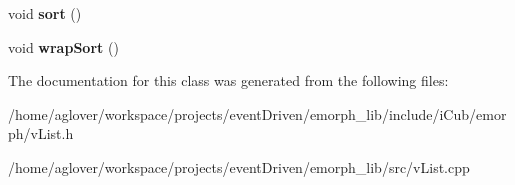 \begin{DoxyCompactItemize}
\item 
\hypertarget{classemorph_1_1vList_a82bd4f316654a59bebd0b48c43027d70}{void {\bfseries sort} ()}\label{classemorph_1_1vList_a82bd4f316654a59bebd0b48c43027d70}

\item 
\hypertarget{classemorph_1_1vList_a5f1930f792c1f0a0bb2ce147df844638}{void {\bfseries wrap\-Sort} ()}\label{classemorph_1_1vList_a5f1930f792c1f0a0bb2ce147df844638}

\end{DoxyCompactItemize}


The documentation for this class was generated from the following files\-:\begin{DoxyCompactItemize}
\item 
/home/aglover/workspace/projects/event\-Driven/emorph\-\_\-lib/include/i\-Cub/emorph/v\-List.\-h\item 
/home/aglover/workspace/projects/event\-Driven/emorph\-\_\-lib/src/v\-List.\-cpp\end{DoxyCompactItemize}
